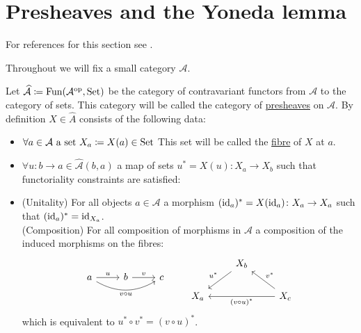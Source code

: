 \section{Presheaves and the Yoneda lemma}

For references for this section see \cite[Section 4.2 \& 4.3]{LeinBasi2014}.

Throughout we will fix a small category $\mathcal{A}$.

\begin{defi}
    Let $\widehat{\mathcal{A}}\coloneqq \operatorname{Fun}(\mathcal{A}^{\operatorname{op}},\operatorname{Set})$ be the category of contravariant functors from $\mathcal{A}$ to the category of sets.
    This category will be called the category of \underline{presheaves} on $\mathcal{A}$.
    By definition $X \in \widehat{A}$ consists of the following data:
    \begin{itemize}
        \item 
        $\forall a \in \mathcal{A} \text{ a set } X_a \coloneqq X(a) \in \operatorname{Set}$
        This set will be called the \underline{fibre} of $X$ at $a$.
        \item 
        $\forall u\colon b \to a\in \widehat{\mathcal{A}}(b,a)$ a map of sets $u^*=X(u)\colon X_a \to X_b$ such that functoriality constraints are satisfied:
        \item 
        (Unitality) For all objects $a \in \mathcal{A}$ a morphism $(\operatorname{id}_a)^*=X(\operatorname{id}_a)\colon X_a \to X_a$ such that $(\operatorname{id}_a)^*=\operatorname{id}_{X_a}$.
        \\
        (Composition) For all composition of morphisms in $\mathcal{A}$ a composition of the induced morphisms on the fibres:
        \[
            \begin{tikzcd}
                a
                \arrow{r}[above]{u}
                \arrow[rr, bend right, "v \circ u"']
                &
                b
                \arrow{r}[above]{v}
                &
                c
            \end{tikzcd} 
            \qquad
            \begin{tikzcd}
                &
                X_b
                \arrow[dl, "u^*"']
                &
                \\
                X_a 
                &
                &
                X_c
                \arrow[ul,"v^*"']    
                \arrow[ll,"(v \circ u)^*"]
            \end{tikzcd}
        \]
        which is equivalent to $u^* \circ v^* = (v \circ u)^*$.
    \end{itemize}
\end{defi}

